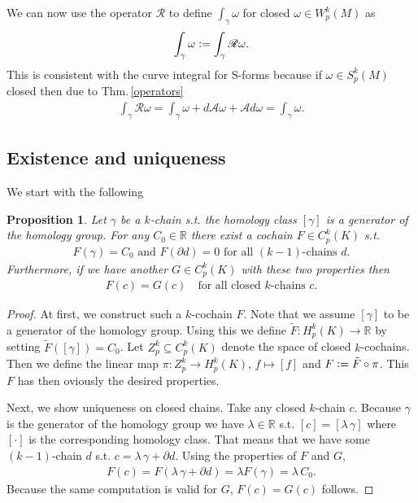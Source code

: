 \documentclass[12pt,a4paper]{article}
\newtheorem{proposition}{Proposition}
\theoremstyle{definition}
\newcommand{\real}{\mathbb{R}}
\newcommand{\rop}{\mathscr{R}} %
\begin{document}
\noindent We can now use the operator $\rop$ to define $\int_\gamma \omega$ for closed
$\omega \in W^k_p(M)$ as
\begin{align*}
\int_\gamma \omega \vcentcolon= \int_\gamma \rop\omega.
\end{align*}
This is consistent with the curve integral for S-forms 
because if $\omega \in S^k_p(M)$ closed then due to 
Thm.\,\ref{operators}
\begin{align*}
\int_\gamma \rop\omega = 
\int_\gamma \omega + d\mathscr{A}\omega + \mathscr{A}d\omega = 
\int_\gamma \omega.
\end{align*}










\subsection{Existence and uniqueness}
We start with the following
\begin{proposition}\label{uniqueness_cochain}
    Let $\gamma$ be a $k$-chain s.t. the homology class $[\gamma]$ 
    is a generator of the homology group. For any $C_0 \in \real$ 
    there exist a cochain $F \in C^k_p(K)$ s.t.
    \begin{align*}
    F(\gamma) = C_0 \text{ and } F(\partial d) = 0 
    \text{ for all } (k-1) \text{-chains } d.
    \end{align*}
    Furthermore, if we have another $G \in C^k_p(K)$ with these two properties
    then 
    \begin{align*}
        F(c) = G(c) \quad \text{for all closed } k \text{-chains } c.
    \end{align*}
\end{proposition} 
\begin{proof}
    At first, we construct such a $k$-cochain $F$. Note that we assume
    $[\gamma]$ to be a generator of the homology group. Using this
    we define $\tilde{F}: H^k_p(K) \rightarrow \real$ by setting 
    $\tilde{F}([\gamma]) = C_0$. Let $Z^k_p \subseteq C^k_p(K)$ 
    denote the space of closed $k$-cochains. Then we define the linear map
    $\pi: Z^k_p \rightarrow H^k_p(K), \, f \mapsto [f]$ and 
    $F \vcentcolon= \tilde{F} \circ \pi$. This $F$ has then oviously the desired
    properties.

    Next, we show uniqueness on closed chains.
    Take any closed $k$-chain $c$. Because $\gamma$ is the generator of the 
    homology group we have $\lambda \in \real$ s.t. $[c] = [\lambda \, \gamma]$ 
    where $[\cdot]$ is the corresponding homology class. That means that we have
    some $(k-1)$-chain $d$ s.t. $c = \lambda \, \gamma + \partial d$. Using the 
    properties of $F$ and $G$,
    \begin{align*}
        F(c) = F(\lambda \, \gamma + \partial d) = 
        \lambda F(\gamma) = \lambda \, C_0.
    \end{align*}
    Because the same computation is valid for $G$, $F(c) = G(c)$ follows.
\end{proof}
\end{document}
